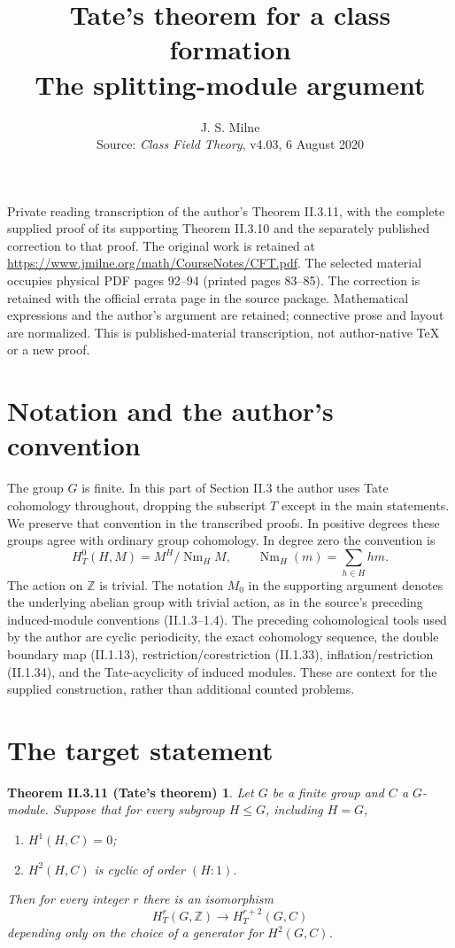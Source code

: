 \documentclass[11pt]{article}
\title{Tate's theorem for a class formation\\The splitting-module argument}
\author{J. S. Milne\\\small Source: \emph{Class Field Theory}, v4.03, 6 August 2020}
\date{}
\newcommand{\HT}[2]{H_T^{#1}(#2)}
\newcommand{\Nm}{\operatorname{Nm}}
\newtheorem*{target}{Theorem II.3.11 (Tate's theorem)}
\begin{document}
\maketitle
\noindent\small
Private reading transcription of the author's Theorem II.3.11, with the complete
supplied proof of its supporting Theorem II.3.10 and the separately published
correction to that proof. The original work is retained at
\url{https://www.jmilne.org/math/CourseNotes/CFT.pdf}.
The selected material occupies physical PDF pages 92--94 (printed pages 83--85).
The correction is retained with the official errata page in the source package.
Mathematical expressions and the author's argument are retained; connective prose
and layout are normalized. This is published-material transcription, not
author-native TeX or a new proof.
\normalsize

\section*{Notation and the author's convention}
The group $G$ is finite. In this part of Section II.3 the author uses Tate
cohomology throughout, dropping the subscript $T$ except in the main statements.
We preserve that convention in the transcribed proofs. In positive degrees these
groups agree with ordinary group cohomology. In degree zero the convention is
\[
 \HT{0}{H,M}=M^H/\Nm_HM,\qquad
 \Nm_H(m)=\sum_{h\in H}hm.
\]
The action on $\mathbb Z$ is trivial. The notation $M_0$ in the supporting
argument denotes the underlying abelian group with trivial action, as in the
source's preceding induced-module conventions (II.1.3--1.4).
The preceding cohomological tools used by the author are cyclic periodicity,
the exact cohomology sequence, the double boundary map (II.1.13),
restriction/corestriction (II.1.33), inflation/restriction (II.1.34),
and the Tate-acyclicity of induced modules. These are context for the supplied
construction, rather than additional counted problems.

\section*{The target statement}
\begin{target}
Let $G$ be a finite group and $C$ a $G$-module. Suppose that for every subgroup
$H\leq G$, including $H=G$,
\begin{enumerate}
\item $H^1(H,C)=0$;
\item $H^2(H,C)$ is cyclic of order $(H:1)$.
\end{enumerate}
Then for every integer $r$ there is an isomorphism
\[
 \HT{r}{G,\mathbb Z}\longrightarrow\HT{r+2}{G,C}
\]
depending only on the choice of a generator for $H^2(G,C)$.
\end{target}
\end{document}
